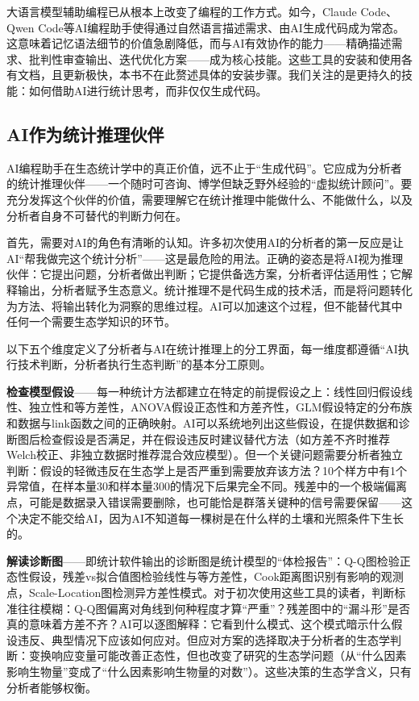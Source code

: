 \documentclass[
  twoside,12pt,fontset=none]{ctexbook}
\begin{document}
大语言模型辅助编程已从根本上改变了编程的工作方式。如今，Claude Code、Qwen Code等AI编程助手使得通过自然语言描述需求、由AI生成代码成为常态。这意味着记忆语法细节的价值急剧降低，而与AI有效协作的能力------精确描述需求、批判性审查输出、迭代优化方案------成为核心技能。这些工具的安装和使用各有文档，且更新极快，本书不在此赘述具体的安装步骤。我们关注的是更持久的技能：如何借助AI进行统计思考，而非仅仅生成代码。

\hypertarget{aiux4f5cux4e3aux7edfux8ba1ux63a8ux7406ux4f19ux4f34}{%
\subsection{AI作为统计推理伙伴}\label{aiux4f5cux4e3aux7edfux8ba1ux63a8ux7406ux4f19ux4f34}}

AI编程助手在生态统计学中的真正价值，远不止于``生成代码''。它应成为分析者的统计推理伙伴------一个随时可咨询、博学但缺乏野外经验的``虚拟统计顾问''。要充分发挥这个伙伴的价值，需要理解它在统计推理中能做什么、不能做什么，以及分析者自身不可替代的判断力何在。

首先，需要对AI的角色有清晰的认知。许多初次使用AI的分析者的第一反应是让AI``帮我做完这个统计分析''------这是最危险的用法。正确的姿态是将AI视为推理伙伴：它提出问题，分析者做出判断；它提供备选方案，分析者评估适用性；它解释输出，分析者赋予生态意义。统计推理不是代码生成的技术活，而是将问题转化为方法、将输出转化为洞察的思维过程。AI可以加速这个过程，但不能替代其中任何一个需要生态学知识的环节。

以下五个维度定义了分析者与AI在统计推理上的分工界面，每一维度都遵循``AI执行技术判断，分析者执行生态判断''的基本分工原则。

\textbf{检查模型假设}------每一种统计方法都建立在特定的前提假设之上：线性回归假设线性、独立性和等方差性，ANOVA假设正态性和方差齐性，GLM假设特定的分布族和数据与link函数之间的正确映射。AI可以系统地列出这些假设，在提供数据和诊断图后检查假设是否满足，并在假设违反时建议替代方法（如方差不齐时推荐Welch校正、非独立数据时推荐混合效应模型）。但一个关键问题需要分析者独立判断：假设的轻微违反在生态学上是否严重到需要放弃该方法？10个样方中有1个异常值，在样本量30和样本量300的情况下后果完全不同。残差中的一个极端偏离点，可能是数据录入错误需要删除，也可能恰是群落关键种的信号需要保留------这个决定不能交给AI，因为AI不知道每一棵树是在什么样的土壤和光照条件下生长的。

\textbf{解读诊断图}------即统计软件输出的诊断图是统计模型的``体检报告''：Q-Q图检验正态性假设，残差vs拟合值图检验线性与等方差性，Cook距离图识别有影响的观测点，Scale-Location图检测异方差性模式。对于初次使用这些工具的读者，判断标准往往模糊：Q-Q图偏离对角线到何种程度才算``严重''？残差图中的``漏斗形''是否真的意味着方差不齐？AI可以逐图解释：它看到什么模式、这个模式暗示什么假设违反、典型情况下应该如何应对。但应对方案的选择取决于分析者的生态学判断：变换响应变量可能改善正态性，但也改变了研究的生态学问题（从``什么因素影响生物量''变成了``什么因素影响生物量的对数''）。这些决策的生态学含义，只有分析者能够权衡。
\end{document}
